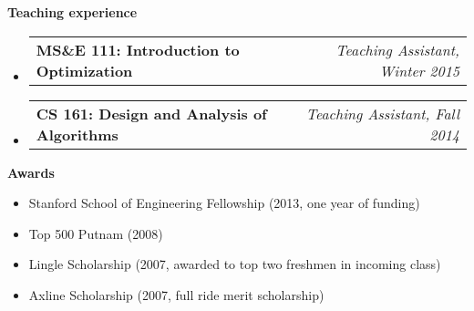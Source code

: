 \documentclass[letterpaper,10pt]{article}
\makeatletter
\newcommand{\resheading}[1]{{\large \colorbox{mygrey}{\begin{minipage}{\textwidth}{\textbf{#1 \vphantom{p\^{E}}}}\end{minipage}}}}
\newcommand{\ressubheading}[4]{
\begin{tabular*}{7.0in}{l@{\extracolsep{\fill}}r}
		\textbf{#1} & \textit{#4} \\
\end{tabular*}\vspace{-6pt}}
\makeatother
\begin{document}
\resheading{Teaching experience}
\begin{itemize}
\item
	\ressubheading{MS\&E 111: Introduction to Optimization}{Stanford, CA}{Teaching Assistant}{Teaching Assistant, Winter 2015}
\item
	\ressubheading{CS 161: Design and Analysis of Algorithms}{Stanford, CA}{Teaching Assistant}{Teaching Assistant, Fall 2014}
\end{itemize}



\resheading{Awards}
\begin{itemize}
	\item Stanford School of Engineering Fellowship (2013, one year of funding)
	\item Top 500 Putnam (2008)
	\item Lingle Scholarship (2007, awarded to top two freshmen in incoming class)
	\item Axline Scholarship (2007, full ride merit scholarship)
\end{itemize}
\end{document}
